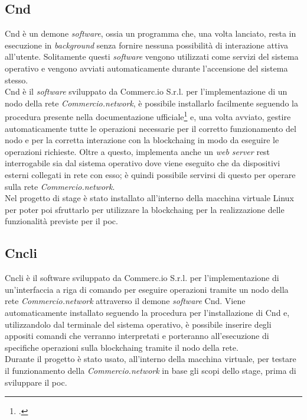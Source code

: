 \subsection{Cnd}

Cnd è un demone \textit{software}, ossia un programma che, una volta lanciato, resta in esecuzione in \textit{background} senza fornire nessuna possibilità di interazione attiva all'utente. Solitamente questi \textit{software} vengono utilizzati come servizi del sistema operativo e vengono avviati automaticamente durante l'accensione del sistema stesso.\\
Cnd è il \textit{software} sviluppato da Commerc.io S.r.l. per l'implementazione di un nodo della rete \textit{Commercio.network}, è possibile installarlo facilmente seguendo la procedura presente nella documentazione ufficiale\footcite{manual:docs-commercio-network} e, una volta avviato, gestire automaticamente tutte le operazioni necessarie per il corretto funzionamento del nodo e per la corretta interazione con la \gls{blockchaing} in modo da eseguire le operazioni richieste. Oltre a questo, implementa anche un \textit{web server} \gls{rest}\glsfirstoccur{} interrogabile sia dal sistema operativo dove viene eseguito che da dispositivi esterni collegati in rete con esso; è quindi possibile servirsi di questo per operare sulla rete \textit{Commercio.network}.\\
Nel progetto di stage è stato installato all'interno della macchina virtuale Linux per poter poi sfruttarlo per utilizzare la \gls{blockchaing} per la realizzazione delle funzionalità previste per il \gls{poc}. 

\subsection{Cncli}

Cncli è il software sviluppato da Commerc.io S.r.l. per l'implementazione di un'interfaccia a riga di comando per eseguire operazioni tramite un nodo della rete \textit{Commercio.network} attraverso il demone \textit{software} Cnd. Viene automaticamente installato seguendo la procedura per l'installazione di Cnd e, utilizzandolo dal terminale del sistema operativo, è possibile inserire degli appositi comandi che verranno interpretati e porteranno all'esecuzione di specifiche operazioni sulla \gls{blockchaing} tramite il nodo della rete.\\
Durante il progetto è stato usato, all'interno della macchina virtuale, per testare il funzionamento della \textit{Commercio.network} in base gli scopi dello stage, prima di sviluppare il \gls{poc}. 


